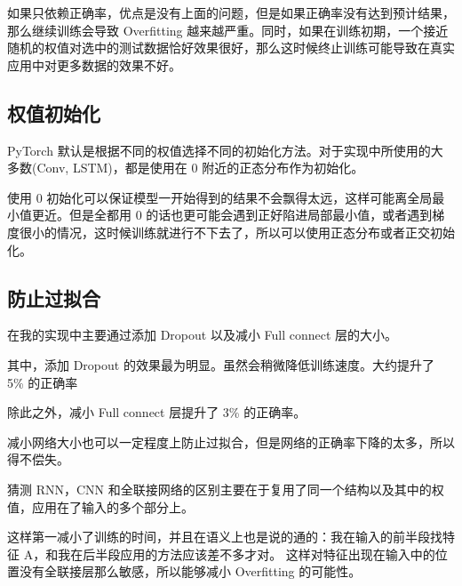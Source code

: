 \documentclass{ctexart}
\begin{document}
如果只依赖正确率，优点是没有上面的问题，但是如果正确率没有达到预计结果，那么继续训练会导致 Overfitting 越来越严重。同时，如果在训练初期，一个接近随机的权值对选中的测试数据恰好效果很好，那么这时候终止训练可能导致在真实应用中对更多数据的效果不好。

\subsection{权值初始化}

PyTorch 默认是根据不同的权值选择不同的初始化方法。对于实现中所使用的大多数(Conv, LSTM)，都是使用在 0 附近的正态分布作为初始化。

使用 0 初始化可以保证模型一开始得到的结果不会飘得太远，这样可能离全局最小值更近。但是全都用 0 的话也更可能会遇到正好陷进局部最小值，或者遇到梯度很小的情况，这时候训练就进行不下去了，所以可以使用正态分布或者正交初始化。

\subsection{防止过拟合}
在我的实现中主要通过添加 Dropout 以及减小 Full connect 层的大小。

其中，添加 Dropout 的效果最为明显。虽然会稍微降低训练速度。大约提升了 5\% 的正确率

除此之外，减小 Full connect 层提升了 3\% 的正确率。

减小网络大小也可以一定程度上防止过拟合，但是网络的正确率下降的太多，所以得不偿失。


猜测 RNN，CNN 和全联接网络的区别主要在于复用了同一个结构以及其中的权值，应用在了输入的多个部分上。

这样第一减小了训练的时间，并且在语义上也是说的通的：我在输入的前半段找特征 A，和我在后半段应用的方法应该差不多才对。  这样对特征出现在输入中的位置没有全联接层那么敏感，所以能够减小 Overfitting 的可能性。 
\end{document}
